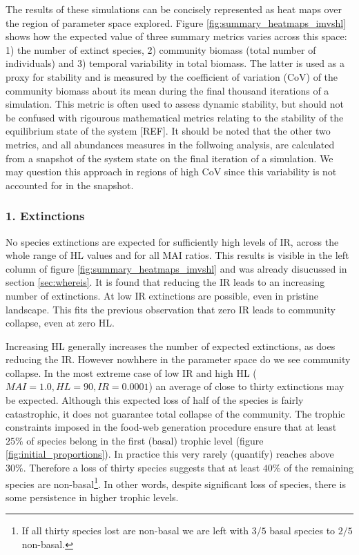 \begin{itemize}
The results of these simulations can be concisely represented as heat maps over the region of parameter space explored. Figure \ref{fig:summary_heatmaps_imvshl} shows how the expected value of three summary metrics varies across this space: 1) the number of extinct species, 2) community biomass (total number of individuals) and 3) temporal variability in total biomass. The latter is used as a proxy for stability and is measured by the coefficient of variation (CoV) of the community biomass about its mean during the final thousand iterations of a simulation. This metric is often used to assess dynamic stability, but should not be confused with rigourous mathematical metrics relating to the stability of the equilibrium state of the system [REF]. It should be noted that the other two metrics, and all abundances measures in the follwoing analysis, are calculated from a snapshot of the system state on the final iteration of a simulation. We may question this approach in regions of high CoV since this variability is not accounted for in the snapshot.     

\subsubsection*{1. Extinctions}

No species extinctions are expected for sufficiently high levels of IR, across the whole range of HL values and for all MAI ratios. This results is visible in the left column of figure \ref{fig:summary_heatmaps_imvshl} and was already disucussed in section \ref{sec:whereis}. It is found that reducing the IR leads to an increasing number of extinctions. At low IR extinctions are possible, even in pristine landscape. This fits the previous observation that zero IR leads to community collapse, even at zero HL.


Increasing HL generally increases the number of expected extinctions, as does reducing the IR. However nowhhere in the parameter space do we see community collapse. In the most extreme case of low IR and high HL ($MAI=1.0,HL=90,IR=0.0001$) an average of close to thirty extinctions may be expected. Although this expected loss of half of the species is fairly catastrophic, it does not guarantee total collapse of the community. The trophic constraints imposed in the food-web generation procedure ensure that at least $25\%$ of species belong in the first (basal) trophic level (figure \ref{fig:initial_proportions}). In practice this very rarely (quantify) reaches above $30\%$. Therefore a loss of thirty species suggests that at least $40\%$ of the remaining species are non-basal\footnote{If all thirty species lost are non-basal we are left with $3/5$ basal species to $2/5$ non-basal.}. In other words, despite significant loss of species, there is some persistence in higher trophic levels. 


\end{itemize}

